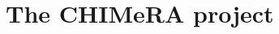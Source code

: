\documentclass{standalone}
\begin{document}
\section[CHIMeRA]{The CHIMeRA project}\label{chimera}

\end{document}
